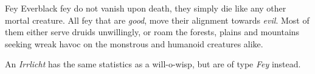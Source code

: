 \begin{35e}{Fey}
  Everblack fey do not vanish upon death, they simply die like any other
  mortal creature. All fey that are \emph{good}, move their alignment towards
  \emph{evil}. Most of them either serve druids unwillingly, or roam the
  forests, plains and mountains seeking wreak havoc on the monstrous and
  humanoid creatures alike.

  An \emph{Irrlicht} has the same statistics as a will-o-wisp, but are of
  type \emph{Fey} instead.
\end{35e}
